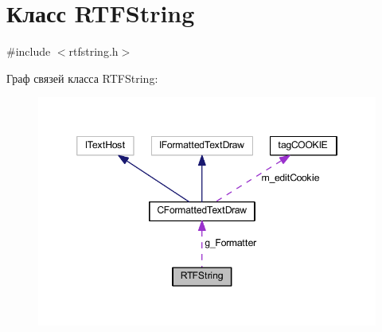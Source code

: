 \hypertarget{class_r_t_f_string}{\section{Класс R\-T\-F\-String}
\label{class_r_t_f_string}
}


{\ttfamily \#include $<$rtfstring.\-h$>$}



Граф связей класса R\-T\-F\-String\-:
\nopagebreak
\begin{figure}[H]
\begin{center}
\leavevmode
\includegraphics[width=346pt]{class_r_t_f_string__coll__graph}
\end{center}
\end{figure}
